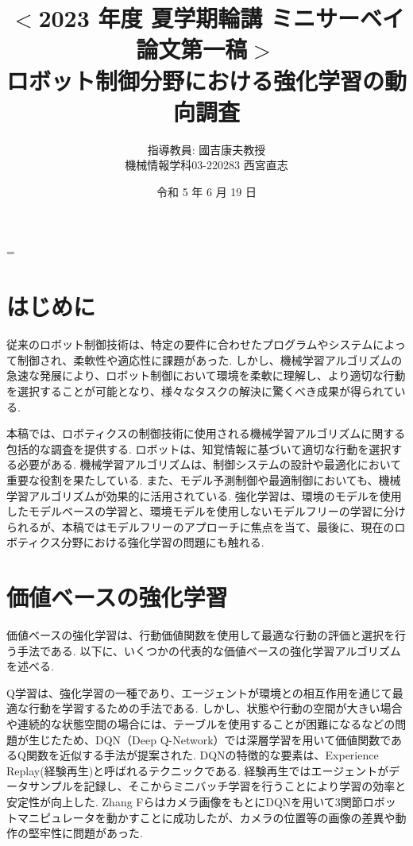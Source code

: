 \documentclass[a4j, twocolumn, 10pt,pdflatex,ja=standard]{bxjsarticle}
\title{{\small $<$2023 年度 夏学期輪講 ミニサーベイ論文第一稿$>$}\\
       {\Large ロボット制御分野における強化学習の動向調査}\vspace{-4mm}}
\author{{\normalsize 指導教員: 國吉康夫教授\\機械情報学科03-220283 西宮直志}\vspace{-4mm}}
\date{\small 令和 5 年 6 月 19 日}
\makeatletter
\renewcommand\maketitle{
  \ifnum \col@number=\@ne \@maketitle
  \else \twocolumn[
    \vspace{-16mm}
    \@maketitle
  ]
  \fi
 }
\makeatother
\begin{document}
\maketitle \thispagestyle{empty}
\normalsize
\vspace{-8mm}

\section{はじめに}

従来のロボット制御技術は、特定の要件に合わせたプログラムやシステムによって制御され、柔軟性や適応性に課題があった. しかし、機械学習アルゴリズムの急速な発展により、ロボット制御において環境を柔軟に理解し、より適切な行動を選択することが可能となり、様々なタスクの解決に驚くべき成果が得られている. 

本稿では、ロボティクスの制御技術に使用される機械学習アルゴリズムに関する包括的な調査を提供する. ロボットは、知覚情報に基づいて適切な行動を選択する必要がある. 機械学習アルゴリズムは、制御システムの設計や最適化において重要な役割を果たしている. また、モデル予測制御や最適制御においても、機械学習アルゴリズムが効果的に活用されている. 強化学習は、環境のモデルを使用したモデルベースの学習と、環境モデルを使用しないモデルフリーの学習に分けられるが、本稿ではモデルフリーのアプローチに焦点を当て、最後に、現在のロボティクス分野における強化学習の問題にも触れる. 

\section{価値ベースの強化学習}

価値ベースの強化学習は、行動価値関数を使用して最適な行動の評価と選択を行う手法である. 以下に、いくつかの代表的な価値ベースの強化学習アルゴリズムを述べる. 

Q学習は、強化学習の一種であり、エージェントが環境との相互作用を通じて最適な行動を学習するための手法である. しかし、状態や行動の空間が大きい場合や連続的な状態空間の場合には、テーブルを使用することが困難になるなどの問題が生じたため、DQN（Deep Q-Network）\cite{dqn}では深層学習を用いて価値関数であるQ関数を近似する手法が提案された. DQNの特徴的な要素は、Experience Replay(経験再生)と呼ばれるテクニックである. 経験再生ではエージェントがデータサンプルを記録し、そこからミニバッチ学習を行うことにより学習の効率と安定性が向上した. Zhang Fらはカメラ画像をもとにDQNを用いて3関節ロボットマニピュレータを動かすことに成功したが、カメラの位置等の画像の差異や動作の堅牢性に問題があった\cite{dqnrobot}. 
\end{document}
